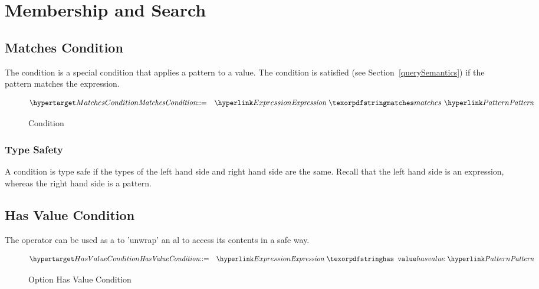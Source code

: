 \section{Membership and Search}
\label{membershipCondition}


\subsection{Matches Condition}
The  condition is a special condition that applies a pattern to a value. The condition is satisfied (see Section~\vref{querySemantics}) if the pattern matches the expression.

\begin{figure}[htbp]
\begin{eqnarray*}
\ntDef{MatchesCondition}&\arrow&\ntRef{Expression}\ \q{matches}\ \ntRef{Pattern}
\end{eqnarray*}
\caption{ Condition}
\label{matchesPredicateFig}
\end{figure}

\subsubsection{Type Safety}
A  condition is type safe if the types of the left hand side and right hand side are the same. Recall that the left hand side is an expression, whereas the right hand side is a pattern.

\begin{prooftree}
\end{prooftree}


\subsection{Has Value Condition}
\label{hasValueCond}

The  operator can be used as a  to 'unwrap' an al to access its contents in a safe way.

\begin{figure}[htbp]
\begin{eqnarray*}
\ntDef{HasValueCondition}&\arrow&\ntRef{Expression}\ \q{has value}\ \ntRef{Pattern}
\end{eqnarray*}
\caption{Option Has Value Condition}\label{optionUnwrapFig}
\end{figure}


